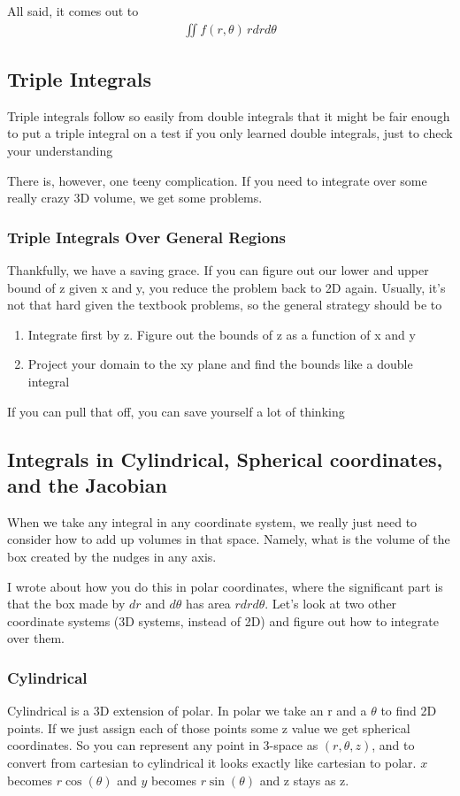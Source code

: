 \documentclass[12pt, letterpaper]{article}
\begin{document}
All said, it comes out to
\begin{gather*}
    \iint f(r, \theta)\,rdrd\theta
\end{gather*}

\subsection{Triple Integrals}
Triple integrals follow so easily from double integrals that it might be fair enough to put a triple integral on a test if you only learned double integrals, just to check your understanding

There is, however, one teeny complication.
If you need to integrate over some really crazy 3D volume, we get some problems.
\subsubsection{Triple Integrals Over General Regions}
Thankfully, we have a saving grace.
If you can figure out our lower and upper bound of z given x and y, you reduce the problem back to 2D again.
Usually, it's not that hard given the textbook problems, so the general strategy should be to
\begin{enumerate}
    \item Integrate first by z. Figure out the bounds of z as a function of x and y
    \item Project your domain to the xy plane and find the bounds like a double integral
\end{enumerate}
If you can pull that off, you can save yourself a lot of thinking
\subsection{Integrals in Cylindrical, Spherical coordinates, and the Jacobian}
When we take any integral in any coordinate system, we really just need to consider how to add up volumes in that space.
Namely, what is the volume of the box created by the nudges in any axis.

I wrote about how you do this in polar coordinates, where the significant part is that the box made by $dr$ and $d\theta$ has area $rdrd\theta$.
Let's look at two other coordinate systems (3D systems, instead of 2D) and figure out how to integrate over them.

\subsubsection{Cylindrical}
Cylindrical is a 3D extension of polar. 
In polar we take an r and a $\theta$ to find 2D points.
If we just assign each of those points some z value we get spherical coordinates.
So you can represent any point in 3-space as $(r, \theta, z)$,
and to convert from cartesian to cylindrical it looks exactly like cartesian to polar.
$x$ becomes $r\cos(\theta)$ and $y$ becomes $r\sin(\theta)$ and z stays as z.
\end{document}
